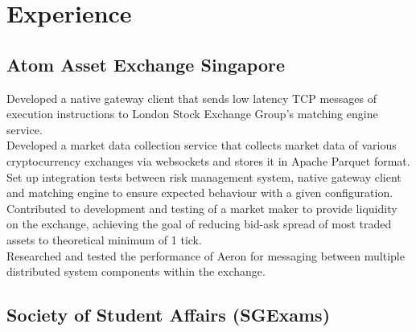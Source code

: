 \documentclass[a4paper,hidelinks]{resume} %
\begin{document}
\begin{minipage}[t]{0.50\textwidth} %

    
    \section{Experience}
    
    \sectionspace %
    
    \subsection{Atom Asset Exchange Singapore}
    
    \textbullet{} Developed a native gateway client that sends low latency TCP messages of execution instructions to London Stock Exchange Group’s matching engine service. \\
    \textbullet{} Developed a market data collection service that collects market data of various cryptocurrency exchanges via websockets and stores it in Apache Parquet format. \\
    \textbullet{} Set up integration tests between risk management system, native gateway client and matching engine to ensure expected behaviour with a given configuration. \\
    \textbullet{} Contributed to development and testing of a market maker to provide liquidity on the exchange, achieving the goal of reducing bid-ask spread of most traded assets to theoretical minimum of 1 tick.\\
    \textbullet{} Researched and tested the performance of Aeron for messaging between multiple distributed system components within the exchange. \\
    
    \sectionspace %
    
    
    \subsection{Society of Student Affairs (SGExams)}
    

\end{minipage}
\end{document}
